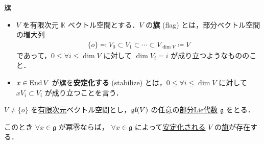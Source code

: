 \documentclass[rep_main]{subfiles}
\begin{document}
\begin{mydef}[label=def:flag]{旗}
    \begin{itemize}
        \item $V$ を有限次元 $\mathbb{K}$ ベクトル空間とする．$V$ の\textbf{旗} (flag) とは，部分ベクトル空間の増大列
        \begin{align}
            \{o\} \eqqcolon V_0 \subset V_1 \subset \cdots \subset V_{\dim V} \coloneqq V
        \end{align}
        であって，$0 \le \forall i \le \dim V$ に対して $\dim V_i = i$ が成り立つようなもののこと．

        \item $x \in \operatorname{End} V$ が旗を\textbf{安定化する} (stabilize) とは，$0 \le \forall i \le \dim V$ に対して $x V_i \subset V_i$ が成り立つことを言う．
    \end{itemize}
\end{mydef}

\begin{mycol}[label=col:Engel-flag]{}
    $V \neq \{o\}$ を\underline{有限次元}ベクトル空間とし，$\mathfrak{gl} (V)$ の任意の\hyperref[def:subLieAlg]{部分Lie代数} $\mathfrak{g}$ をとる．

    このとき $\forall x \in \mathfrak{g}$ が冪零ならば， $\forall x \in \mathfrak{g}$ によって\hyperref[def:flag]{安定化される} $V$ の\hyperref[def:flag]{旗}が存在する．
\end{mycol}
\end{document}
